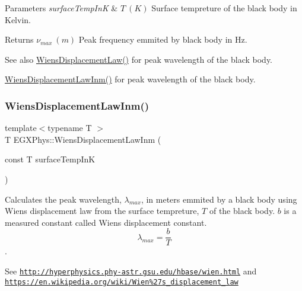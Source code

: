 \begin{DoxyParams}{Parameters}
{\em surface\+Temp\+InK} & $T\ (K)$ Surface tempreture of the black body in Kelvin. \\
\hline
\end{DoxyParams}
\begin{DoxyReturn}{Returns}
$\nu_{max}\ (m)$ Peak frequency emmited by black body in Hz. 
\end{DoxyReturn}
\begin{DoxySeeAlso}{See also}
\mbox{\hyperlink{group___e_g_x_phys-_electrodynamics-_black_body-_wiens_displacement_law_ga8f89ce1baac45a1717f604255d04af44}{Wiens\+Displacement\+Law()}} for peak wavelength of the black body. 

\mbox{\hyperlink{group___e_g_x_phys-_electrodynamics-_black_body-_wiens_displacement_law_ga126ebb146c31a2371f1d1d001d11c62f}{Wiens\+Displacement\+Law\+Inm()}} for peak wavelength of the black body. 
\end{DoxySeeAlso}
\mbox{\label{group___e_g_x_phys-_electrodynamics-_black_body-_wiens_displacement_law_ga126ebb146c31a2371f1d1d001d11c62f}} 
\subsubsection{\texorpdfstring{Wiens\+Displacement\+Law\+Inm()}{WiensDisplacementLawInm()}}
{\footnotesize\ttfamily template$<$typename T $>$ \\
T E\+G\+X\+Phys\+::\+Wiens\+Displacement\+Law\+Inm (\begin{DoxyParamCaption}\item[{const T}]{surface\+Temp\+InK }\end{DoxyParamCaption})}



Calculates the peak wavelength, $\lambda_{max}$, in meters emmited by a black body using Wien\textquotesingle{}s displacement law from the surface tempreture, $T$ of the black body. $b$ is a measured constant called Wien\textquotesingle{}s displacement constant. \[\lambda_{max} = \dfrac{b}{T} \]. 

See \href{http://hyperphysics.phy-astr.gsu.edu/hbase/wien.html}{\tt http\+://hyperphysics.\+phy-\/astr.\+gsu.\+edu/hbase/wien.\+html} and \href{https://en.wikipedia.org/wiki/Wien%27s_displacement_law}{\tt https\+://en.\+wikipedia.\+org/wiki/\+Wien\%27s\+\_\+displacement\+\_\+law}


